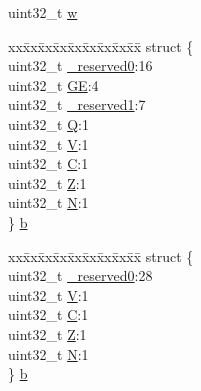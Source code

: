 \begin{DoxyCompactItemize}
\begin{tabbing}
\end{tabbing}\item 
uint32\+\_\+t \hyperlink{union_a_p_s_r___type_ae4c2ef8c9430d7b7bef5cbfbbaed3a94}{w}
\item 
\begin{tabbing}
xx\=xx\=xx\=xx\=xx\=xx\=xx\=xx\=xx\=\kill
struct \{\\
\>uint32\_t \hyperlink{union_a_p_s_r___type_afbce95646fd514c10aa85ec0a33db728}{\_reserved0}:16\\
\>uint32\_t \hyperlink{union_a_p_s_r___type_adcb98a5b9c93b0cb69cdb7af5638f32e}{GE}:4\\
\>uint32\_t \hyperlink{union_a_p_s_r___type_ac681f266e20b3b3591b961e13633ae13}{\_reserved1}:7\\
\>uint32\_t \hyperlink{union_a_p_s_r___type_a22d10913489d24ab08bd83457daa88de}{Q}:1\\
\>uint32\_t \hyperlink{union_a_p_s_r___type_a8004d224aacb78ca37774c35f9156e7e}{V}:1\\
\>uint32\_t \hyperlink{union_a_p_s_r___type_a86e2c5b891ecef1ab55b1edac0da79a6}{C}:1\\
\>uint32\_t \hyperlink{union_a_p_s_r___type_a3b04d58738b66a28ff13f23d8b0ba7e5}{Z}:1\\
\>uint32\_t \hyperlink{union_a_p_s_r___type_a7e7bbba9b00b0bb3283dc07f1abe37e0}{N}:1\\
\} \hyperlink{union_a_p_s_r___type_a58bbe4a401dd92b53a0e9e2ab20486a9}{b}\\

\end{tabbing}\item 
\begin{tabbing}
xx\=xx\=xx\=xx\=xx\=xx\=xx\=xx\=xx\=\kill
struct \{\\
\>uint32\_t \hyperlink{union_a_p_s_r___type_afbce95646fd514c10aa85ec0a33db728}{\_reserved0}:28\\
\>uint32\_t \hyperlink{union_a_p_s_r___type_a8004d224aacb78ca37774c35f9156e7e}{V}:1\\
\>uint32\_t \hyperlink{union_a_p_s_r___type_a86e2c5b891ecef1ab55b1edac0da79a6}{C}:1\\
\>uint32\_t \hyperlink{union_a_p_s_r___type_a3b04d58738b66a28ff13f23d8b0ba7e5}{Z}:1\\
\>uint32\_t \hyperlink{union_a_p_s_r___type_a7e7bbba9b00b0bb3283dc07f1abe37e0}{N}:1\\
\} \hyperlink{union_a_p_s_r___type_a99c3ab089dde40ee2a043b340006df66}{b}\\


\end{tabbing}
\end{DoxyCompactItemize}
